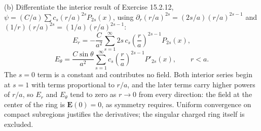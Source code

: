 (b) Differentiate the interior result of Exercise 15.2.12,
$\psi=(C/a)\sum c_s(r/a)^{2s}P_{2s}(x)$, using
$\partial_r(r/a)^{2s}=(2s/a)(r/a)^{2s-1}$ and
$(1/r)(r/a)^{2s}=(1/a)(r/a)^{2s-1}$:
\[
\boxed{E_r=-\frac C{a^2}\sum_{s=1}^\infty
2s\,c_s\left(\frac ra\right)^{2s-1}P_{2s}(x)},
\]
\[
\boxed{E_\theta=\frac{C\sin\theta}{a^2}\sum_{s=1}^\infty
c_s\left(\frac ra\right)^{2s-1}P'_{2s}(x)},\qquad r<a.
\]
The $s=0$ term is a constant and contributes no field.
Both interior series begin at $s=1$ with terms proportional to $r/a$,
and the later terms carry higher powers of $r/a$, so $E_r$ and
$E_\theta$ tend to zero as $r\to0$ from every direction: the field at
the center of the ring is $\mathbf E(0)=0$, as symmetry requires.
Uniform convergence on compact subregions justifies the derivatives;
the singular charged ring itself is excluded.

